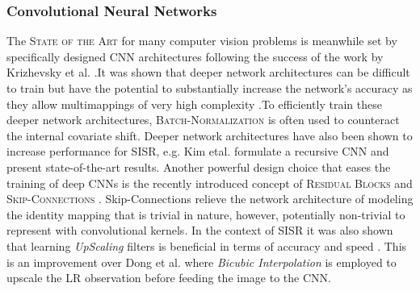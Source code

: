 \documentclass[12pt]{article}
\begin{document}
			\subsubsection{Convolutional Neural Networks}
				The \textsc{State of the Art} for many computer vision problems is meanwhile set by specifically designed CNN architectures following the success of the work by Krizhevsky et al. \cite{16}.It was shown that deeper network architectures can be difficult to train but have the potential to substantially increase the network’s accuracy as they allow multimappings of very high complexity \cite{17}\cite{18}.To efficiently train these deeper network architectures, \textsc{Batch-Normalization} \cite{19} is often used to counteract the internal covariate shift. Deeper network architectures have also been shown to increase performance for SISR, e.g. Kim etal. \cite{20} formulate a recursive CNN and present state-of-the-art results. Another powerful design choice that eases the training of deep CNNs is the recently introduced concept of \textsc{Residual Blocks} \cite{21} and \textsc{Skip-Connections} \cite{20}. Skip-Connections relieve the network architecture of modeling the identity mapping that is trivial in nature, however, potentially non-trivial to represent with convolutional kernels. In the context of SISR it was also shown that learning \textit{UpScaling} filters is beneficial in terms of accuracy and speed \cite{22}. This is an improvement over Dong et al. \cite{23} where \textit{Bicubic Interpolation} is employed to upscale the LR observation before feeding the image to the CNN.
\end{document}
